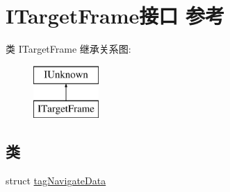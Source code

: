 \hypertarget{interface_i_target_frame}{}\section{I\+Target\+Frame接口 参考}
\label{interface_i_target_frame}
类 I\+Target\+Frame 继承关系图\+:\begin{figure}[H]
\begin{center}
\leavevmode
\includegraphics[height=2.000000cm]{interface_i_target_frame}
\end{center}
\end{figure}
\subsection*{类}
\begin{DoxyCompactItemize}
\item 
struct \hyperlink{struct_i_target_frame_1_1tag_navigate_data}{tag\+Navigate\+Data}
\end{DoxyCompactItemize}
